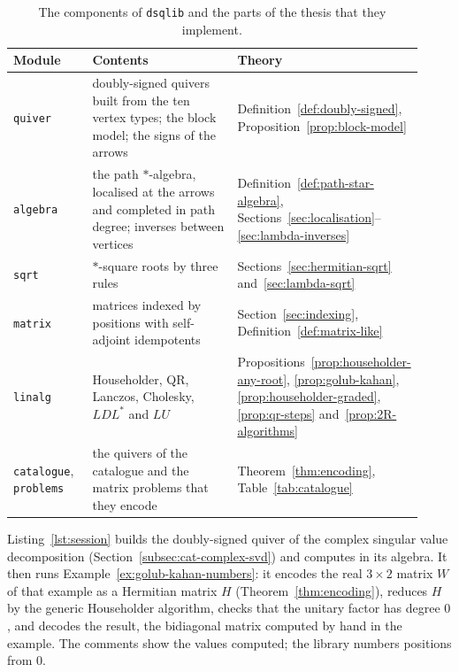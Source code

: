 \documentclass[12pt, a4paper]{report}
\theoremstyle{plain}
\theoremstyle{definition}
\theoremstyle{remark}
\theoremstyle{plain}
\newcommand{\rowrule}{\arrayrulecolor{black!30}\midrule[0.3pt]\arrayrulecolor{black}}
\begin{document}
\begin{table}[htbp]
\centering
\caption{The components of \texttt{dsqlib} and the parts of the thesis that they implement.}
\label{tab:implementation}
\small
\renewcommand{\arraystretch}{1.25}
\begin{tabular}{@{}>{\raggedright\arraybackslash}p{0.2\linewidth}>{\raggedright\arraybackslash}p{0.42\linewidth}>{\raggedright\arraybackslash}p{0.3\linewidth}@{}}
\toprule
\textbf{Module} & \textbf{Contents} & \textbf{Theory} \\
\midrule
\texttt{quiver} & doubly-signed quivers built from the ten vertex types; the block model; the signs of the arrows & Definition~\ref{def:doubly-signed}, Proposition~\ref{prop:block-model} \\
\rowrule
\texttt{algebra} & the path $*$-algebra, localised at the arrows and completed in path degree; inverses between vertices & Definition~\ref{def:path-star-algebra}, Sections~\ref{sec:localisation}--\ref{sec:lambda-inverses} \\
\rowrule
\texttt{sqrt} & $*$-square roots by three rules & Sections~\ref{sec:hermitian-sqrt} and~\ref{sec:lambda-sqrt} \\
\rowrule
\texttt{matrix} & matrices indexed by positions with self-adjoint idempotents & Section~\ref{sec:indexing}, Definition~\ref{def:matrix-like} \\
\rowrule
\texttt{linalg} & Householder, QR, Lanczos, Cholesky, $LDL^*$ and $LU$ & Propositions~\ref{prop:householder-any-root}, \ref{prop:golub-kahan}, \ref{prop:householder-graded}, \ref{prop:qr-steps} and~\ref{prop:2R-algorithms} \\
\rowrule
\texttt{catalogue}, \texttt{problems} & the quivers of the catalogue and the matrix problems that they encode & Theorem~\ref{thm:encoding}, Table~\ref{tab:catalogue} \\
\bottomrule
\end{tabular}
\end{table}

Listing~\ref{lst:session} builds the doubly-signed quiver of the complex singular value decomposition (Section~\ref{subsec:cat-complex-svd}) and computes in its algebra. It then runs Example~\ref{ex:golub-kahan-numbers}: it encodes the real $3\times2$ matrix $W$ of that example as a Hermitian matrix $H$ (Theorem~\ref{thm:encoding}), reduces $H$ by the generic Householder algorithm, checks that the unitary factor has degree $0$, and decodes the result, the bidiagonal matrix computed by hand in the example. The comments show the values computed; the library numbers positions from $0$.
\end{document}
